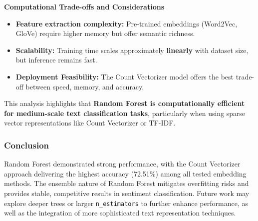 \textbf{Computational Trade-offs and Considerations}

\begin{itemize}
\item \textbf{Feature extraction complexity:} Pre-trained embeddings (Word2Vec, GloVe) require higher memory but offer semantic richness.
\item \textbf{Scalability:} Training time scales approximately \textbf{linearly} with dataset size, but inference remains fast.
\item \textbf{Deployment Feasibility:} The Count Vectorizer model offers the best trade-off between speed, memory, and accuracy.
\end{itemize}

This analysis highlights that \textbf{Random Forest is computationally efficient for medium-scale text classification tasks}, particularly when using sparse vector representations like Count Vectorizer or TF-IDF.


\subsubsection{Conclusion}

Random Forest demonstrated strong performance, with the Count Vectorizer approach delivering the highest accuracy (72.51\%) among all tested embedding methods. The ensemble nature of Random Forest mitigates overfitting risks and provides stable, competitive results in sentiment classification. Future work may explore deeper trees or larger \texttt{n\_estimators} to further enhance performance, as well as the integration of more sophisticated text representation techniques.

\newpage